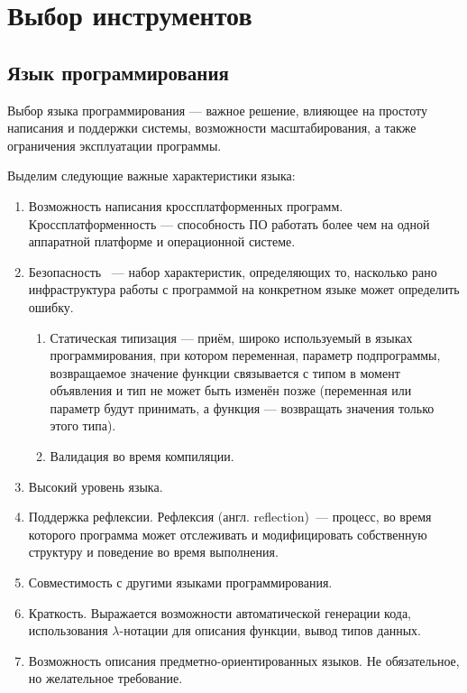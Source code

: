 \chapter{Выбор инструментов} 

\section{Язык программирования}
Выбор языка программирования --- важное решение, влияющее на простоту написания и поддержки системы, возможности масштабирования, а также ограничения эксплуатации программы.

Выделим следующие важные характеристики языка:
\begin{enumerate}
	\item Возможность написания кроссплатформенных программ. Кроссплатформенность --- способность ПО работать более чем на одной аппаратной платформе и операционной системе.
	\item Безопасность ~--- набор характеристик, определяющих то, насколько рано инфраструктура работы с программой на конкретном языке может определить ошибку. 
	\begin{enumerate}
		\item Статическая типизация — приём, широко используемый в языках программирования, при котором переменная, параметр подпрограммы, возвращаемое значение функции связывается с типом в момент объявления и тип не может быть изменён позже (переменная или параметр будут принимать, а функция — возвращать значения только этого типа).
		\item Валидация во время компиляции.
	\end{enumerate}
	\item Высокий уровень языка.
	\item Поддержка рефлексии. Рефлексия (англ. reflection)~--- процесс, во время которого программа может отслеживать и модифицировать собственную структуру и поведение во время выполнения.
	\item Совместимость с другими языками программирования. 
	\item Краткость. Выражается возможности автоматической генерации кода, использования $ \lambda $-нотации для описания функции, вывод типов данных.
	\item Возможность описания предметно-ориентированных языков. Не обязательное, но желательное требование.
\end{enumerate}

